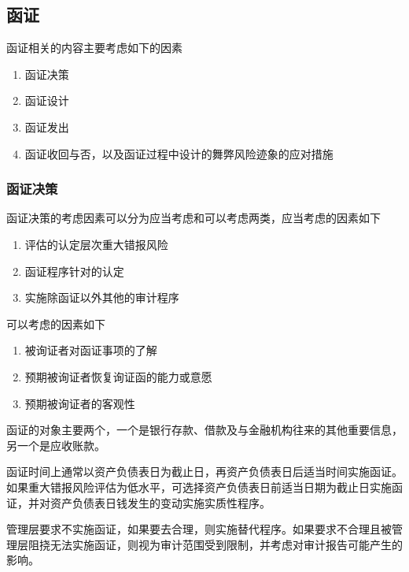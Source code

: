 \documentclass[UTF8,12pt]{ctexart}
\numberwithin{equation}{section} %
\numberwithin{figure}{section}
\numberwithin{table}{section}
\begin{document}
	\subsection{函证}
	函证相关的内容主要考虑如下的因素
	\begin{enumerate}
		\item 函证决策
		
		\item 函证设计
		
		\item 函证发出
		
		\item 函证收回与否，以及函证过程中设计的舞弊风险迹象的应对措施
	\end{enumerate}
	
	\subsubsection{函证决策}
	函证决策的考虑因素可以分为应当考虑和可以考虑两类，应当考虑的因素如下
	\begin{enumerate}
		\item 评估的认定层次重大错报风险
		
		\item 函证程序针对的认定
		
		\item 实施除函证以外其他的审计程序
	\end{enumerate}
	
	可以考虑的因素如下
	\begin{enumerate}
		\item 被询证者对函证事项的了解
		
		\item 预期被询证者恢复询证函的能力或意愿
		
		\item 预期被询证者的客观性
	\end{enumerate}
	
	函证的对象主要两个，一个是银行存款、借款及与金融机构往来的其他重要信息，另一个是应收账款。
	
	函证时间上通常以资产负债表日为截止日，再资产负债表日后适当时间实施函证。如果重大错报风险评估为低水平，可选择资产负债表日前适当日期为截止日实施函证，并对资产负债表日钱发生的变动实施实质性程序。
	
	管理层要求不实施函证，如果要去合理，则实施替代程序。如果要求不合理且被管理层阻挠无法实施函证，则视为审计范围受到限制，并考虑对审计报告可能产生的影响。
	
\end{document}

